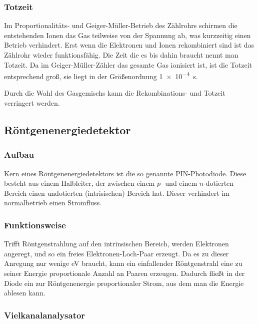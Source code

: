 \subsubsection{Totzeit}

Im Proportionalitäts- und Geiger-Müller-Betrieb des Zählrohrs schirmen die
entstehenden Ionen das Gas teilweise von der Spannung ab, was kurzzeitig
einen Betrieb verhindert. Erst wenn die Elektronen und Ionen rekombiniert
sind ist das Zählrohr wieder funktionsfähig. Die Zeit die es bis dahin
braucht nennt man Totzeit. Da im Geiger-Müller-Zähler das gesamte Gas
ionisiert ist, ist die Totzeit entsprechend groß, sie liegt in der
Größenordnung \SI{1e-4}{\second}.

Durch die Wahl des Gasgemischs kann die Rekombinations- und Totzeit
verringert werden.

\subsection{Röntgenenergiedetektor}

\subsubsection{Aufbau}

Kern eines Röntgenenergiedetektors ist die so genannte PIN-Photodiode.
Diese besteht aus einem Halbleiter, der zwischen einem $p$- und einem
$n$-dotierten Bereich einen undotierten (intrisischen) Bereich hat. Dieser
verhindert im normalbetrieb einen Stromfluss.

\subsubsection{Funktionsweise}

Trifft Röntgenstrahlung auf den intrinsischen Bereich, werden Elektronen
angeregt, und so ein freies Elektronen-Loch-Paar erzeugt. Da es zu dieser
Anregung nur wenige \si{\electronvolt} braucht, kann ein einfallender
Röntgenstrahl eine zu seiner Energie proportionale Anzahl an Paaren
erzeugen. Dadurch fließt in der Diode ein zur Röntgenenergie proportionaler
Strom, aus dem man die Energie ablesen kann.

\parencite[Abschnitt~„Photodiode“]{wikipedia/pin-Diode}

\subsubsection{Vielkanalanalysator}

